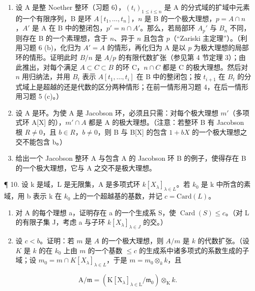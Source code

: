 \begin{enumerate}
\def\labelenumi{\arabic{enumi}.}
\setcounter{enumi}{6}
\item
  设 A 是整 Noether 整环（习题 6），\((t_i)_{1 \leq i \leq n}\) 是 A 的分式域的扩域中元素的一个有限序列，B 是环 \(A[t_1, \ldots, t_n]\)，\(n\) 是 B 的一个极大理想，\(p = A \cap n\)，\(A'\) 是 A 在 B 中的整闭包，\(p' = n \cap A'\)。那么，若局部环 \(A_p'\) 与 \(B_n\) 不同，则存在 B 的一个素理想，含于 \(n\)、异于 \(n\) 且包含 \(p\)（“Zariski 主定理”）。（利用习题 6 (b)，化归为 \(A' = A\) 的情形，再化归为 A 是以 \(p\) 为极大理想的局部环的情形。证明此时 \(B/n\) 是 \(A/p\) 的有限代数扩张（参见第 4 节定理 3）；由此推出，对每个满足 \(A \subset C \subset B\) 的环 C，\(n \cap C\) 都是 C 的极大理想。然后对 \(n\) 用归纳法，并用 \(B_t\) 表示 \(A[t_1, \ldots, t_i]\) 在 B 中的整闭包；按 \(t_{i+1}\) 在 \(B_t\) 的分式域上是超越的还是代数的区分两种情形；在前一情形用习题 4，在后一情形用习题 5 (c)。）
\item
  设 A 是环。为使 A 是 Jacobson 环，必须且只需：对每个极大理想 \(m'\)（多项式环 A{[}X{]} 的），\(m' \cap A\) 都是 A 的极大理想。（注意：若整环 B 有 Jacobson 根 \(R \neq 0\)，且 \(b \in R\)，\(b \neq 0\)，则 B 与 B{[}X{]} 的包含 \(1 + bX\) 的一个极大理想之交不能包含 b。）
\item
  给出一个 Jacobson 整环 A 与包含 A 的 Jacobson 环 B 的例子，使得存在 B 的一个极大理想，它与 A 之交不是极大理想。
\end{enumerate}

¶ 10. 设 k 是域，L 是无限集，A 是多项式环 \(k[X_{\lambda}]_{\lambda \in L}\)。若 \(k_{0}\) 是 k 中所含的素域，用 b 表示 k 在 \(k_{0}\) 上的一个超越基的基数，并记 \(c = \text{Card}(L)\)。

\begin{enumerate}
\def\labelenumi{(\alph{enumi})}
\item
  对 A 的每个理想 a，证明存在 a 的一个生成系 S，使 \(\operatorname{Card}(S) \leqslant c\)。（对 L 的有限子集 J，考虑 a 与子环 \(k[X_{\lambda}]_{\lambda \in J}\) 的交。）
\item
  设 \(c < b\)。证明：若 \(m\) 是 \(A\) 的一个极大理想，则 \(A / m\) 是 \(k\) 的代数扩张。（设 \(K\) 是 \(k\) 的在 \(k_0\) 上由 \(m\) 的一个基数 \(\leqslant c\) 的生成系中诸多项式的系数生成的子域；设 \(m_0 = m \cap K[X_\lambda]_{\lambda \in L}\)，于是 \(m = m_0 \otimes_k k\)，且
\end{enumerate}

\[
\mathrm{A} / \mathfrak {m} = (\mathrm{K} [ \mathrm{X} _ {\lambda} ] _ {\lambda \in \mathrm{L}} / \mathfrak {m} _ {0}) \otimes_ {\mathrm{K}} k.
\]

